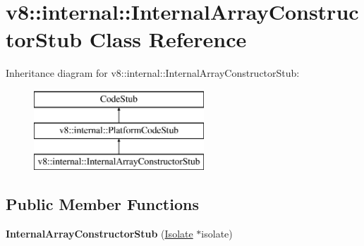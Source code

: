 \hypertarget{classv8_1_1internal_1_1_internal_array_constructor_stub}{}\section{v8\+:\+:internal\+:\+:Internal\+Array\+Constructor\+Stub Class Reference}
\label{classv8_1_1internal_1_1_internal_array_constructor_stub}
Inheritance diagram for v8\+:\+:internal\+:\+:Internal\+Array\+Constructor\+Stub\+:\begin{figure}[H]
\begin{center}
\leavevmode
\includegraphics[height=3.000000cm]{classv8_1_1internal_1_1_internal_array_constructor_stub}
\end{center}
\end{figure}
\subsection*{Public Member Functions}
\begin{DoxyCompactItemize}
\item 
{\bfseries Internal\+Array\+Constructor\+Stub} (\hyperlink{classv8_1_1internal_1_1_isolate}{Isolate} $\ast$isolate)\hypertarget{classv8_1_1internal_1_1_internal_array_constructor_stub_af11d51976f9c56f1b801e42f9e24b2e1}{}\label{classv8_1_1internal_1_1_internal_array_constructor_stub_af11d51976f9c56f1b801e42f9e24b2e1}

\end{DoxyCompactItemize}
